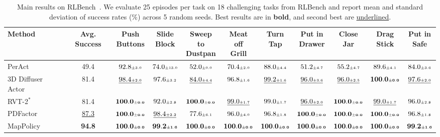 \begin{table}[t]
\centering
\caption{Main results on RLBench~\cite{James2020RLBench}. We evaluate 25 episodes per task on 18 challenging tasks from RLBench and report mean and standard deviation of success rates (\%) across 5 random seeds. Best results are in \textbf{bold}, and second best are \underline{underlined}.}
\label{tab:main_results_rlbench}
\scriptsize
\setlength{\tabcolsep}{3.5pt}
\begin{adjustbox}{max width=\textwidth}
\begin{tabular}{l|c|ccccccccc}
\toprule
\rowcolor{tablehead}
Method & Avg. Success &
\shortstack{Push\\Buttons} &
\shortstack{Slide\\Block} &
\shortstack{Sweep to\\Dustpan} &
\shortstack{Meat off\\Grill} &
\shortstack{Turn\\Tap} &
\shortstack{Put in\\Drawer} &
\shortstack{Close\\Jar} &
\shortstack{Drag\\Stick} &
\shortstack{Put in\\Safe} \\
\midrule
PerAct~\cite{shridhar2022peract} & 49.4 & $92.8{\scriptscriptstyle\pm 3.0}$ & $74.0{\scriptscriptstyle\pm 13.0}$ & $52.0{\scriptscriptstyle\pm 0.0}$ & $70.4{\scriptscriptstyle\pm 2.0}$ & $88.0{\scriptscriptstyle\pm 4.4}$ & $51.2{\scriptscriptstyle\pm 4.7}$ & $55.2{\scriptscriptstyle\pm 4.7}$ & $89.6{\scriptscriptstyle\pm 4.1}$ & $84.0{\scriptscriptstyle\pm 3.6}$ \\
3D Diffuser Actor~\cite{3d_diffuser_actor} & 81.4 & $\underline{98.4{\scriptscriptstyle\pm 2.0}}$ & $97.6{\scriptscriptstyle\pm 3.2}$ & $\underline{84.0{\scriptscriptstyle\pm 4.4}}$ & $96.8{\scriptscriptstyle\pm 1.6}$ & $\underline{99.2{\scriptscriptstyle\pm 1.6}}$ & $\underline{96.0{\scriptscriptstyle\pm 3.6}}$ & $\underline{96.0{\scriptscriptstyle\pm 2.5}}$ & $\mathbf{100.0{\scriptscriptstyle\pm 0.0}}$ & $\underline{97.6{\scriptscriptstyle\pm 2.0}}$ \\
RVT-2$^\ast$~\cite{goyal2024rvt2} & 81.4 & $\mathbf{100.0{\scriptscriptstyle\pm 0.0}}$ & $92.0{\scriptscriptstyle\pm 2.8}$ & $\mathbf{100.0{\scriptscriptstyle\pm 0.0}}$ & $\underline{99.0{\scriptscriptstyle\pm 1.7}}$ & $99.0{\scriptscriptstyle\pm 1.7}$ & $\underline{96.0{\scriptscriptstyle\pm 2.0}}$ & $\mathbf{100.0{\scriptscriptstyle\pm 0.0}}$ & $\underline{99.0{\scriptscriptstyle\pm 1.7}}$ & $96.0{\scriptscriptstyle\pm 2.8}$ \\
PDFactor~\cite{Tian_2025_CVPR} & \underline{87.3} & $\mathbf{100.0{\scriptscriptstyle\pm 0.0}}$ & $\underline{98.4{\scriptscriptstyle\pm 2.2}}$ & $77.6{\scriptscriptstyle\pm 6.1}$ & $96.0{\scriptscriptstyle\pm 4.0}$ & $96.8{\scriptscriptstyle\pm 1.8}$ & $\mathbf{100.0{\scriptscriptstyle\pm 0.0}}$ & $\mathbf{100.0{\scriptscriptstyle\pm 0.0}}$ & $\mathbf{100.0{\scriptscriptstyle\pm 0.0}}$ & $96.8{\scriptscriptstyle\pm 1.8}$ \\
\midrule
MapPolicy & \textbf{94.8} & $\mathbf{100.0{\scriptscriptstyle\pm 0.0}}$ & $\mathbf{99.2{\scriptscriptstyle\pm 1.6}}$ & $\mathbf{100.0{\scriptscriptstyle\pm 0.0}}$ & $\mathbf{100.0{\scriptscriptstyle\pm 0.0}}$ & $\mathbf{100.0{\scriptscriptstyle\pm 0.0}}$ & $\mathbf{100.0{\scriptscriptstyle\pm 0.0}}$ & $\mathbf{100.0{\scriptscriptstyle\pm 0.0}}$ & $\mathbf{100.0{\scriptscriptstyle\pm 0.0}}$ & $\mathbf{99.2{\scriptscriptstyle\pm 1.6}}$ \\
\bottomrule
\end{tabular}
\end{adjustbox}


\end{table}
